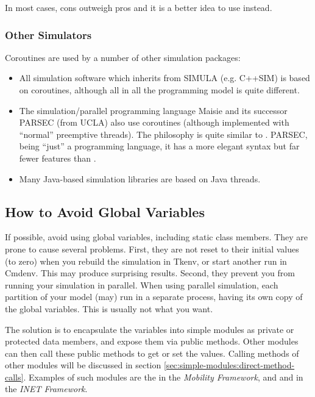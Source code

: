 In most cases, cons outweigh pros and it is a better idea to use
 instead.


\subsubsection{Other Simulators}


Coroutines are used by a number of other simulation packages:
\begin{itemize}
\item{All simulation software which inherits from SIMULA (e.g. C++SIM)
    is based on coroutines, although all in all the programming
    model is quite different.}
\item{The simulation/parallel programming language Maisie and its successor
    PARSEC (from UCLA) also use coroutines (although implemented
    with ``normal'' preemptive threads). The philosophy
    is quite similar to {\opp}. PARSEC, being ``just''
    a programming language, it has a more elegant syntax but far fewer
    features than {\opp}.}
\item{Many Java-based simulation libraries are based on Java
    threads.}
\end{itemize}

\subsection{How to Avoid Global Variables}
\label{sec:simple-modules:global-vars}

If possible, avoid using global variables, including
static class members. They are prone to cause several problems.
First, they are not reset to their initial values (to zero)
when you rebuild the simulation in Tkenv, or start another run
in Cmdenv. This may produce surprising results.
Second, they prevent you from running your simulation in parallel.
When using parallel simulation, each partition of your model
(may) run in a separate process, having its own copy of the
global variables. This is usually not what you want.

The solution is to encapsulate the variables into simple modules
as private or protected data members, and expose them via public methods.
Other modules can then call these public methods to get or set the values.
Calling methods of other modules will be discussed in section
\ref{sec:simple-modules:direct-method-calls}.
Examples of such modules are the  in the \textit{Mobility Framework},
and  and  in the \textit{INET Framework}.


